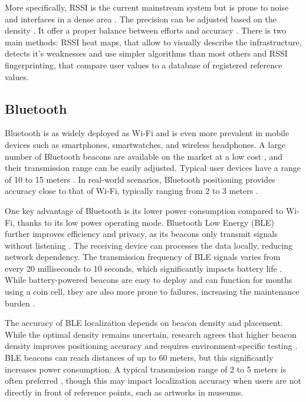 More specifically, RSSI is the current mainstream system but is prone to noise and interfaces in a dense area \cite{spachos_ble_2020}. The precision can be adjusted based on the density \cite{shang_overview_2022}. It offer a proper balance between efforts and accuracy \cite{ali_locali_2017}. There is two main methods:
 RSSI heat maps, that allow to visually describe the infrastructure, detects it's weaknesses and use simpler algorithms than most others \cite{ali_locali_2017} and RSSI fingerprinting, that compare user values to a database of registered reference values. 

\subsection{Bluetooth}

Bluetooth is as widely deployed as Wi-Fi and is even more prevalent in mobile devices such as smartphones, smartwatches, and wireless headphones. A large number of Bluetooth beacons are available on the market at a low cost \cite{spachos_ble_2020}, and their transmission range can be easily adjusted. Typical user devices have a range of 10 to 15 meters \cite{mainetti_survey_2014}. In real-world scenarios, Bluetooth positioning provides accuracy close to that of Wi-Fi, typically ranging from 2 to 3 meters \cite{mainetti_survey_2014} \cite{spachos_ble_2020}.   

One key advantage of Bluetooth is its lower power consumption compared to Wi-Fi, thanks to its low power  operating mode. Bluetooth Low Energy (BLE) further improves efficiency and privacy, as its beacons only transmit signals without listening \cite{spachos_ble_2020}. The receiving device can processes the data locally, reducing network dependency. The transmission frequency of BLE signals varies from every 20 milliseconds to 10 seconds, which significantly impacts battery life \cite{spachos_ble_2020}. While battery-powered beacons are easy to deploy and can function for months using a coin cell, they are also more prone to failures, increasing the maintenance burden \cite{spachos_ble_2020}.   

The accuracy of BLE localization depends on beacon density and placement. While the optimal density remains uncertain, research agrees that higher beacon density improves positioning accuracy and requires environment-specific testing \cite{spachos_ble_2020} \cite{shang_overview_2022}. BLE beacons can reach distances of up to 60 meters, but this significantly increases power consumption. A typical transmission range of 2 to 5 meters is often preferred \cite{spachos_ble_2020}, though this may impact localization accuracy when users are not directly in front of reference points, such as artworks in museums.   

